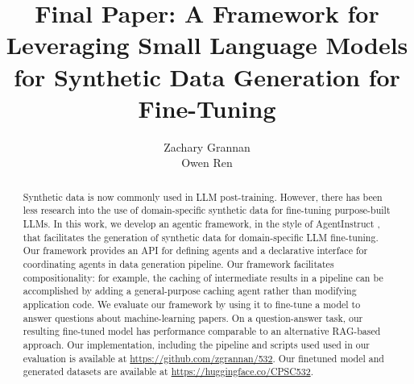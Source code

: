 \documentclass{article}
\title{Final Paper: A Framework for Leveraging Small Language Models for Synthetic Data Generation for
Fine-Tuning}
\author{%
  Zachary Grannan \\
  \And{}
  Owen Ren
}
\begin{document}
\maketitle

\begin{abstract}
Synthetic data is now commonly used in LLM post-training. However, there has
been less research into the use of domain-specific synthetic data for
fine-tuning purpose-built LLMs. In this work, we develop an agentic framework,
in the style of AgentInstruct \citep{mitra_agentinstruct_2024}, that facilitates
the generation of synthetic data for domain-specific LLM fine-tuning. Our
framework provides an API for defining agents and a declarative interface for
coordinating agents in data generation pipeline. Our framework facilitates
compositionality: for example, the caching of intermediate results in a pipeline
can be accomplished by adding a general-purpose caching agent rather than
modifying application code.  We evaluate our framework by using it to fine-tune
a model to answer questions about machine-learning papers. On a question-answer
task, our resulting fine-tuned model has performance comparable to an
alternative RAG-based approach. Our implementation, including the pipeline and scripts used
used in our evaluation is available at \url{https://github.com/zgrannan/532}. Our finetuned 
model and generated datasets are available at \url{https://huggingface.co/CPSC532}.
\end{abstract}










\clearpage





\end{document}
